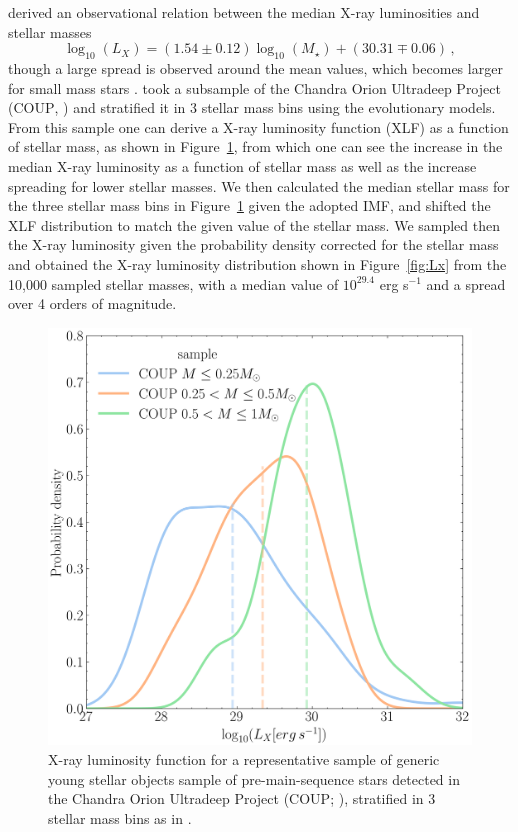 \documentclass[fleqn,usenatbib,letters]{mnras}
\begin{document}
\citet{Gudel2007} derived an observational relation between the median X-ray luminosities and stellar masses
\begin{equation} \label{eq:LxMstar}
    \log_{10}(L_{X}) = (1.54\pm0.12) \log_{10}(M_\star) + (30.31\mp0.06) \,,
\end{equation}
though a large spread is observed around the mean values, which becomes larger for small mass stars \citep[e.g.][]{Getman2022}.
\citet{Kuhn2019} took a subsample of the Chandra Orion Ultradeep Project (\textsc{COUP}, \citet{Feigelson2005,Getman2005}) and stratified it in 3 stellar mass bins using the \citet{Baraffe1998} evolutionary models. From this sample one can derive a X-ray luminosity function (XLF) as a function of stellar mass, as shown in Figure~\ref{fig:XLF}, from which one can see the increase in the median X-ray luminosity as a function of stellar mass as well as the increase spreading for lower stellar masses. We then calculated the median stellar mass for the three stellar mass bins in Figure~\ref{fig:XLF} given the adopted IMF, and shifted the XLF distribution to match the given value of the stellar mass. We sampled then the X-ray luminosity given the probability density corrected for the stellar mass and obtained the X-ray luminosity distribution shown in Figure~\ref{fig:Lx} from the 10,000 sampled stellar masses, with a median value of $10^{29.4}$ erg s$^{-1}$ and a spread over 4 orders of magnitude.
\begin{figure}
    \includegraphics[width=\columnwidth]{Fig2}
    \caption{X-ray luminosity function for a representative sample of generic young stellar objects sample of pre-main-sequence stars detected in the Chandra Orion Ultradeep Project (\textsc{COUP}; \citet{Feigelson2005,Getman2005}), stratified in 3 stellar mass bins as in \citet{Kuhn2019}. \label{fig:XLF}}
\end{figure}
\end{document}
